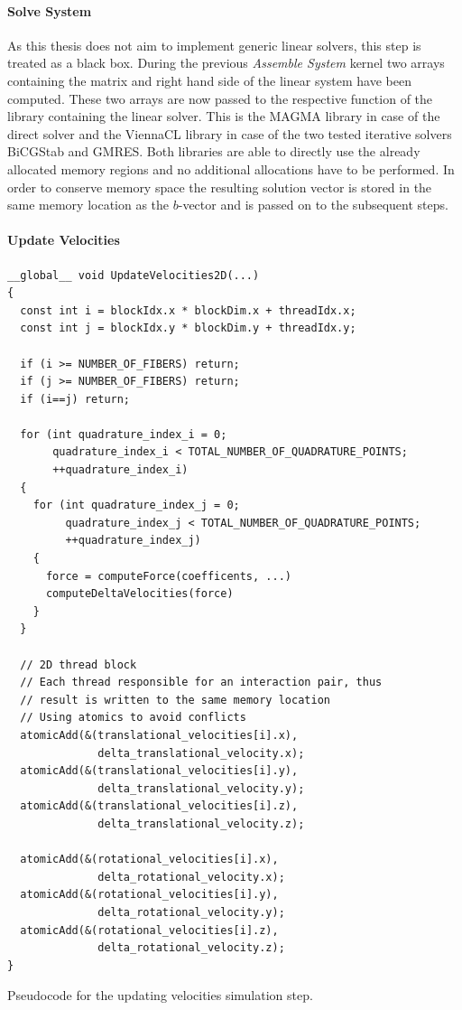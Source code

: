 \documentclass[a4paper,11pt]{kth-mag}
\begin{document}
\paragraph{Solve System}
As this thesis does not aim to implement generic linear solvers, this step is treated as a black box. During the previous \emph{Assemble System} kernel two arrays containing the matrix and right hand side of the linear system have been computed. These two arrays are now passed to the respective function of the library containing the linear solver. This is the MAGMA library in case of the direct solver and the ViennaCL library in case of the two tested iterative solvers BiCGStab and GMRES. Both libraries are able to directly use the already allocated memory regions and no additional allocations have to be performed. In order to conserve memory space the resulting solution vector is stored in the same memory location as the $b$-vector and is passed on to the subsequent steps.

\paragraph{Update Velocities}

\begin{listing}[!htbp]
  \centering
  \begin{verbatim}
__global__ void UpdateVelocities2D(...)
{
  const int i = blockIdx.x * blockDim.x + threadIdx.x;
  const int j = blockIdx.y * blockDim.y + threadIdx.y;

  if (i >= NUMBER_OF_FIBERS) return;
  if (j >= NUMBER_OF_FIBERS) return;
  if (i==j) return;

  for (int quadrature_index_i = 0;
       quadrature_index_i < TOTAL_NUMBER_OF_QUADRATURE_POINTS;
       ++quadrature_index_i)
  {
    for (int quadrature_index_j = 0;
         quadrature_index_j < TOTAL_NUMBER_OF_QUADRATURE_POINTS;
         ++quadrature_index_j)
    {
      force = computeForce(coefficents, ...)
      computeDeltaVelocities(force)
    }
  }

  // 2D thread block
  // Each thread responsible for an interaction pair, thus
  // result is written to the same memory location
  // Using atomics to avoid conflicts
  atomicAdd(&(translational_velocities[i].x),
              delta_translational_velocity.x);
  atomicAdd(&(translational_velocities[i].y),
              delta_translational_velocity.y);
  atomicAdd(&(translational_velocities[i].z),
              delta_translational_velocity.z);

  atomicAdd(&(rotational_velocities[i].x),
              delta_rotational_velocity.x);
  atomicAdd(&(rotational_velocities[i].y),
              delta_rotational_velocity.y);
  atomicAdd(&(rotational_velocities[i].z),
              delta_rotational_velocity.z);
}
  \end{verbatim}
  \caption{Pseudocode for the updating velocities simulation step.}
  \label{lst:pseudo_update_velocities}
\end{listing}
\end{document}
